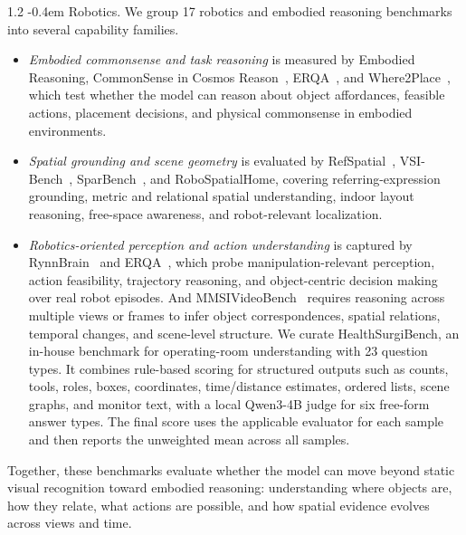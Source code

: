 \documentclass{llmxive}
\makeatletter
\providecommand{\paragraph}{  \@startsection{paragraph}{4}{\z@}    {1\baselineskip \@plus .2\baselineskip}    {-0.4em}    {\normalfont\normalsize\bfseries}}
\makeatother
\begin{document}
\paragraph{Robotics.} 
We group 17 robotics and embodied reasoning benchmarks into several capability families.
\begin{itemize}
  \item \textit{Embodied commonsense and task reasoning} is measured by Embodied Reasoning, CommonSense in Cosmos Reason~\citep{azzolini2025cosmos}, ERQA~\citep{gemini2025robotics}, and Where2Place~\citep{yuan2024robopoint}, which test whether the model can reason about
  object affordances, feasible actions,  placement decisions, and physical commonsense in embodied environments.
  \item \textit{Spatial grounding and scene geometry} is evaluated by RefSpatial~\citep{zhou2025roborefer}, VSI-Bench~\citep{yang2024vsibench}, SparBench~\citep{zhang2025spar}, and RoboSpatialHome\citep{song2025robospatial}, covering referring-expression grounding, metric and relational
  spatial understanding, indoor layout reasoning, free-space awareness, and robot-relevant localization.
  \item \textit{Robotics-oriented perception and action understanding} is captured by RynnBrain~\citep{dang2026rynnbrain} and ERQA~\citep{gemini2025robotics}, which probe manipulation-relevant perception, action feasibility, trajectory reasoning, and object-centric decision making over real robot episodes.
  And MMSIVideoBench~\citep{lin2025mmsivideobench} requires reasoning across multiple views or frames to infer object
  correspondences, spatial relations, temporal changes, and scene-level structure. We curate HealthSurgiBench, an in-house benchmark for operating-room understanding with 23 question types. It combines rule-based scoring for structured outputs such as counts, tools, roles,
  boxes, coordinates, time/distance estimates, ordered lists, scene graphs, and monitor text, with a local Qwen3-4B judge for six free-form answer types. The final score uses the applicable evaluator for each sample and then reports the unweighted mean across all samples.
\end{itemize}
Together, these benchmarks evaluate whether the model can move beyond static visual recognition toward embodied reasoning: understanding where objects are, how they relate, what actions are possible, and how spatial evidence evolves across views and time.
\end{document}
